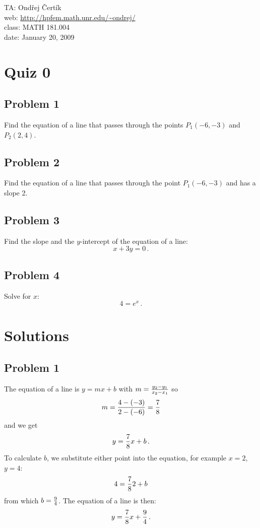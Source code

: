 \documentclass[11pt]{article}
\begin{document}
\noindent TA: Ondřej Čertík\\
web: \url{http://hpfem.math.unr.edu/~ondrej/}\\
class: MATH 181.004\\
date: January 20, 2009

\section*{Quiz 0}

\subsection*{Problem 1}

Find the equation of a line that passes through the points $P_1(-6, -3)$ and
$P_2(2, 4)$.

\subsection*{Problem 2}

Find the equation of a line that passes through the point $P_1(-6, -3)$ and has
a slope 2.

\subsection*{Problem 3}

Find the slope and the $y$-intercept of the equation of a line:
$$x+3y=0\,.$$

\subsection*{Problem 4}

Solve for $x$:
$$4=e^x\,.$$

\section*{Solutions}

\subsection*{Problem 1}

The equation of a line is $y=mx+b$ with $m={y_2-y_1\over x_2-x_1}$ so
$$m={4-(-3)\over2-(-6)}={7\over8}$$
and we get
$$y={7\over8}x+b\,.$$
To calculate $b$, we substitute either point into the equation, for example
$x=2$, $y=4$:
$$4={7\over8}2+b$$
from which $b={9\over4}$. The equation of a line is then:
$$y={7\over8}x+{9\over 4}\,.$$
\end{document}
